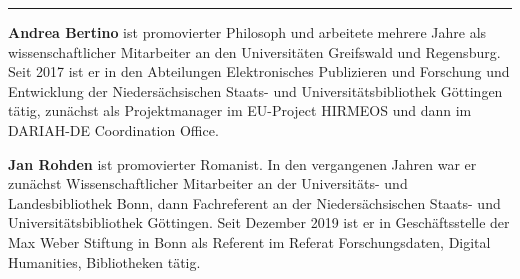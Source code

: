\begin{center}\rule{0.5\linewidth}{\linethickness}\end{center}

\textbf{Andrea Bertino} ist promovierter Philosoph und arbeitete mehrere
Jahre als wissenschaftlicher Mitarbeiter an den Universitäten Greifswald
und Regensburg. Seit 2017 ist er in den Abteilungen Elektronisches
Publizieren und Forschung und Entwicklung der Niedersächsischen Staats-
und Universitätsbibliothek Göttingen tätig, zunächst als Projektmanager
im EU-Project HIRMEOS und dann im DARIAH-DE Coordination Office.

\textbf{Jan Rohden } ist promovierter Romanist. In den vergangenen
Jahren war er zunächst Wissenschaftlicher Mitarbeiter an der
Universitäts- und Landesbibliothek Bonn, dann Fachreferent an der
Niedersächsischen Staats- und Universitätsbibliothek Göttingen. Seit
Dezember 2019 ist er in Geschäftsstelle der Max Weber Stiftung in Bonn
als Referent im Referat Forschungsdaten, Digital Humanities,
Bibliotheken tätig.

